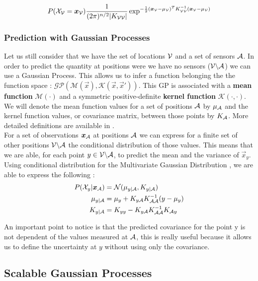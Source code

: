 \begin{equation}
    P(\mathcal{X}_{\mathcal{V}} = {\boldsymbol{{x}}}_{\mathcal{V}}) \frac{1}{(2\pi)^{n/2} |K_{\mathcal{V}\mathcal{V}}|} \exp^{-\frac{1}{2}({\boldsymbol{{x}}}_{\mathcal{V}} - \mu_{\mathcal{V}})^T K_{\mathcal{V}\mathcal{V}}^{-1} ({\boldsymbol{{x}}}_{\mathcal{V}} - \mu_{\mathcal{V}})}
\end{equation}


\subsubsection{Prediction with Gaussian Processes}
Let us still consider that we have the set of locations $\mathcal{V}$ and a set of sensors $\mathcal{A}$. In order to predict the quantity at positions were we have no sensors ($\mathcal{V} \backslash \mathcal{A} $) we can use a Gaussian Process. This allows us to infer a function belonging the the function space : $\mathcal{GP}(\mathcal{M}(\vec{x}), \mathcal{K}(\vec{x},\vec{x}'))$.  This GP is associated with a \textbf{mean function} $\mathcal{M}(\cdot)$ and a symmetric positive-definite \textbf{kernel function} $\mathcal{K}(\cdot,\cdot)$. We will denote the mean function values for a set of positions $\mathcal{A}$ by $\mu_{\mathcal{A}}$ and the kernel function values, or covariance matrix, between those points by $K_{\mathcal{A}}$. More detailed definitions are available in \citet[p.~13-16]{rasmussen_gaussian_2006}. \\

For a set of observations ${\boldsymbol{{x}}}_{\mathcal{A}}$ at positions $\mathcal{A}$ we can express for a finite set of other positions $\mathcal{V} \backslash \mathcal{A} $ the conditional distribution of those values. This means that we are able, for each point $y \in \mathcal{V} \backslash \mathcal{A} $, to predict the mean and the variance of $\vec{x}_y$. Using conditional distribution for the Multivariate Gaussian Distribution \citep[p.~193]{deisenroth_mathematics_2018}, we are able to express the following : 
\begin{align}
    P(\mathcal{X}_y | {\boldsymbol{{x}}}_{\mathcal{A}} ) &= \mathcal{N}(\mu_{y | \mathcal{A}}, K_{y | \mathcal{A}}) \\
    \mu_{y | \mathcal{A}} &= \mu_y + K_{y\mathcal{A}} K_{\mathcal{A}\mathcal{A}}^{-1} (y - \mu_y)\\ 
    K_{y | \mathcal{A}} &=  K_{yy} - K_{y\mathcal{A}} K_{\mathcal{A}\mathcal{A}}^{-1} K_{\mathcal{A} y} \label{equ:covGP}
\end{align}

An important point to notice is that the predicted covariance for the point y is not dependent of the values measured at $\mathcal{A}$, this is really useful because it allows us to define the uncertainty at $y$ without using only the covariance. \\

\subsection{Scalable Gaussian Processes} 

